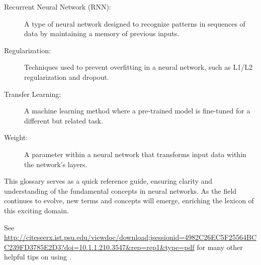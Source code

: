 \begin{description}
    \item[Recurrent Neural Network (RNN):] A type of neural network designed to recognize patterns in sequences of data by maintaining a memory of previous inputs.
    
    \item[Regularization:] Techniques used to prevent overfitting in a neural network, such as L1/L2 regularization and dropout.
    
    \item[Transfer Learning:] A machine learning method where a pre-trained model is fine-tuned for a different but related task.
    
    \item[Weight:] A parameter within a neural network that transforms input data within the network's layers.
\end{description}

This glossary serves as a quick reference guide, ensuring clarity and understanding of the fundamental concepts in neural networks. As the field continues to evolve, new terms and concepts will emerge, enriching the lexicon of this exciting domain.

\begin{resource}
See \url{http://citeseerx.ist.psu.edu/viewdoc/download;jsessionid=4982C26EC5F25564BCC239FD3785E2D3?doi=10.1.1.210.3547&rep=rep1&type=pdf} for many other helpful tips on using \ipopt.
\end{resource}
